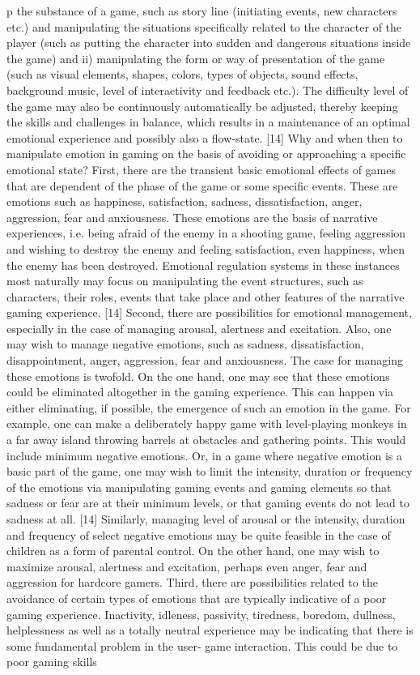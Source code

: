 p the substance of a game, such as story line (initiating events, new characters etc.) and manipulating the situations specifically related to the character of the player (such as putting the character into sudden and dangerous situations inside the game) and ii) manipulating the form or way of presentation of the game (such as visual elements, shapes, colors, types of objects, sound effects, background music, level of interactivity and feedback etc.). The difficulty level of the game may also be continuously automatically be adjusted, thereby keeping the skills and challenges in balance, which results in a maintenance of an optimal emotional experience and possibly also a flow-state. [14]  Why and when then to manipulate emotion in gaming on the basis of avoiding or approaching a specific emotional state? First, there are the transient basic emotional effects of games that are dependent of the phase of the game or some specific events. These are emotions such as happiness, satisfaction, sadness, dissatisfaction, anger, aggression, fear and anxiousness. These emotions are the basis of narrative experiences, i.e. being afraid of the enemy in a shooting game, feeling aggression and wishing to destroy the enemy and feeling satisfaction, even happiness, when the enemy has been destroyed. Emotional regulation systems in these instances most naturally may focus on manipulating the event structures, such as characters, their roles, events that take place and other features of the narrative gaming experience. [14] Second, there are possibilities for emotional management, especially in the case of managing arousal, alertness and excitation. Also, one may wish to manage negative emotions, such as sadness, dissatisfaction, disappointment, anger, aggression, fear and anxiousness. The case for managing these emotions is twofold. On the one hand, one may see that these emotions could be eliminated altogether in the gaming experience. This can happen via either eliminating, if possible, the emergence of such an emotion in the game. For example, one can make a deliberately happy game with level-playing monkeys in a far away island throwing barrels at obstacles and gathering points. This would include minimum negative emotions. Or, in a game where negative emotion is a basic part of the game, one may wish to limit the intensity, duration or frequency of the emotions via manipulating gaming events and gaming elements so that sadness or fear are at their minimum levels, or that gaming events do not lead to sadness at all. [14] Similarly, managing level of arousal or the intensity, duration and frequency of select negative emotions may be quite feasible in the case of children as a form of parental control. On the other hand, one may wish to maximize arousal, alertness and excitation, perhaps even anger, fear and aggression for hardcore gamers. Third, there are possibilities related to the avoidance of certain types of emotions that are typically indicative of a poor gaming experience. Inactivity, idleness, passivity, tiredness, boredom, dullness, helplessness as well as a totally neutral experience may be indicating that there is some fundamental problem in the user- game interaction. This could be due to poor gaming skills 